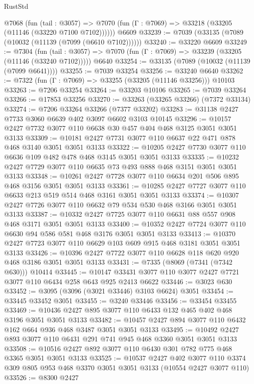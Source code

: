 \begin{lexlean}{RustStd}
\begin{coremodule}
    @7068
      (fun (tail : @3057) =>
      @7070 (fun (Γ : @7069) => @33218 (@33205 (@11146 (@33220 @7100 @7102))))))
    @6609
@33239 := @7039 (@33135 (@7089 (@10032 (@11139 (@7099 (@6610 @7102))))))
@33240 := @33220 @6609
@33249 := @7304
    (fun (tail : @3057) => @7070 (fun (Γ : @7069) => @33239 (@33205 (@11146 (@33240 @7102)))))
    @6640
@33254 := @33135 (@7089 (@10032 (@11139 (@7099 @6641))))
@33255 := @7039 @33254
@33256 := @33240 @6640
@33262 := @7322 (fun (Γ : @7069) => @33255 (@33205 (@11146 @33256))) @10103
@33263 := @7206 @33254
@33264 := @33203 @10106
@33265 := @7039 @33264
@33266 := @17853 @33256
@33270 := @33263 (@33265 @33266) (@7372 @33134)
@33274 := @7206 @33264 @33266 (@7377 @33202)
@33283 := @31138 @2427 @7733 @3060 @6639 @402 @3097 @6602 @3103 @10145
@33296 := @10157 @2427 @7732 @3077 @110 @6638 @30 @457 @404 @468 @3125 @3051 @3051 @3133
@33309 := @10181 @2427 @7731 @3077 @110 @6637 @22 @471 @878 @468 @3140 @3051 @3051 @3133
@33322 := @10205 @2427 @7730 @3077 @110 @6636 @109 @482 @478 @468 @3145 @3051 @3051 @3133
@33335 := @10232 @2427 @7729 @3077 @110 @6635 @73 @493 @888 @468 @3151 @3051 @3051 @3133
@33348 := @10261 @2427 @7728 @3077 @110 @6634 @201 @506 @895 @468 @3156 @3051 @3051 @3133
@33361 := @10285 @2427 @7727 @3077 @110 @6633 @213 @519 @514 @468 @3161 @3051 @3051 @3133
@33374 := @10307 @2427 @7726 @3077 @110 @6632 @79 @534 @530 @468 @3166 @3051 @3051 @3133
@33387 := @10332 @2427 @7725 @3077 @110 @6631 @88 @557 @908 @468 @3171 @3051 @3051 @3133
@33400 := @10352 @2427 @7724 @3077 @110 @6630 @94 @586 @581 @468 @3176 @3051 @3051 @3133
@33413 := @10370 @2427 @7723 @3077 @110 @6629 @103 @609 @915 @468 @3181 @3051 @3051 @3133
@33426 := @10396 @2427 @7722 @3077 @110 @6628 @118 @620 @920 @468 @3186 @3051 @3051 @3133
@33431 := @7335 (@8069 (@7341 (@7342 @630))) @10414
@33445 := @10147 @33431 @3077 @110 @3077 @2427 @7721 @3077 @110 @6434 @258 @643 @925 @2413 @6622
@33446 := @3023 @630
@33452 := @3095 (@3096 (@3021 @33446) @3103 @6624) @3051
@33454 := @33445 @33452 @3051
@33455 := @3240 @33446
@33456 := @33454 @33455
@33469 := @10436 @2427 @895 @3077 @110 @6433 @132 @465 @402 @468 @3196 @3051 @3051 @3133
@33482 := @10457 @2427 @894 @3077 @110 @6432 @162 @664 @936 @468 @3487 @3051 @3051 @3133
@33495 := @10492 @2427 @893 @3077 @110 @6431 @291 @741 @945 @468 @3360 @3051 @3051 @3133
@33508 := @10516 @2427 @892 @3077 @110 @6430 @301 @782 @775 @468 @3365 @3051 @3051 @3133
@33525 := @10537
    @2427
    @402
    @3077
    @110
    @3374
    @309
    @805
    @953
    @468
    @3370
    @3051
    @3051
    @3133
    (@10554 @2427 @3077 @110)
@33526 := @8300 @2427

\end{coremodule}
\end{lexlean}
